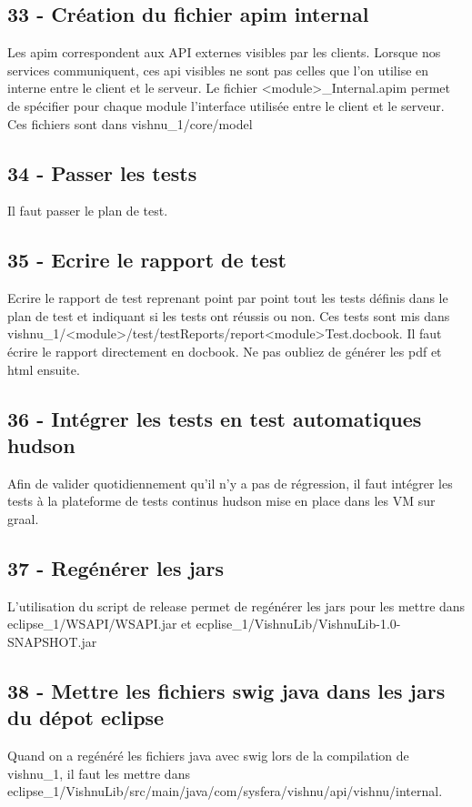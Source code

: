 \documentclass{article}
\begin{document}
\subsection{33 - Création du fichier apim internal}
Les apim correspondent aux API externes visibles par les clients.
Lorsque nos services communiquent, ces api visibles ne sont pas celles
que l'on utilise en interne entre le client et le serveur. Le fichier
<module>\_Internal.apim permet de spécifier pour chaque module l'interface 
utilisée entre le client et le serveur.
Ces fichiers sont dans vishnu\_1/core/model

\subsection{34 - Passer les tests}
Il faut passer le plan de test.

\subsection{35 - Ecrire le rapport de test}
Ecrire le rapport de test reprenant point par point tout les tests définis
dans le plan de test et indiquant si les tests ont réussis ou non.
Ces tests sont mis dans \\
vishnu\_1/<module>/test/testReports/report<module>Test.docbook. Il faut
écrire le rapport directement en docbook.
Ne pas oubliez de générer les pdf et html ensuite.

\subsection{36 - Intégrer les tests en test automatiques hudson}
Afin de valider quotidiennement qu'il n'y a pas de régression, il faut 
intégrer les tests à la plateforme de tests continus hudson mise en 
place dans les VM sur graal.

\subsection{37 - Regénérer les jars}
L'utilisation du script de release permet de regénérer les jars pour les mettre
dans \\
 eclipse\_1/WSAPI/WSAPI.jar et ecplise\_1/VishnuLib/VishnuLib-1.0-SNAPSHOT.jar

\subsection{38 - Mettre les fichiers swig java dans les jars du dépot eclipse}
Quand on a regénéré les fichiers java avec swig lors de la compilation de 
vishnu\_1, il faut les mettre dans \\
 eclipse\_1/VishnuLib/src/main/java/com/sysfera/vishnu/api/vishnu/internal.
\end{document}

